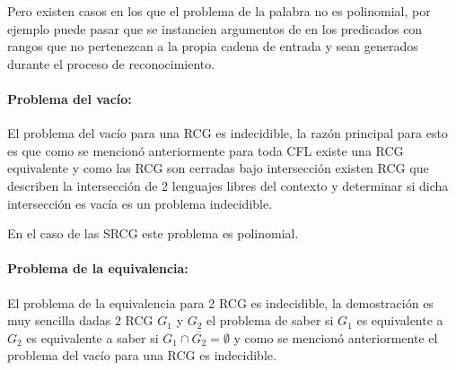 \documentclass{article}
\begin{document}
Pero existen casos en los que el problema de la palabra no
es polinomial, por ejemplo puede pasar que se instancien argumentos de en los predicados con rangos que no pertenezcan
a la propia cadena de entrada y sean generados durante el proceso de reconocimiento.

\paragraph{Problema del vacío:} El problema del vacío para una RCG es indecidible, la razón principal para esto es que como se mencionó anteriormente
para toda CFL existe una RCG equivalente y como las RCG son cerradas bajo intersección existen RCG que describen
la intersección de 2 lenguajes libres del contexto y determinar si dicha intersección es vacía es un problema indecidible.

En el caso de las SRCG este problema es polinomial.

\paragraph{Problema de la equivalencia:} El problema de la equivalencia para 2 RCG es indecidible, la demostración es muy sencilla dadas 2 RCG $G_1$ y $G_2$ el problema
de saber si $G_1$ es equivalente a $G_2$ es equivalente a saber si $G_1\cap \overline{G_2}=\emptyset$ y como se mencionó anteriormente el problema del vacío para una RCG
es indecidible.





\end{document}
